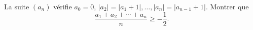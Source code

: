 La suite $(a_n)$ vérifie $a_0 = 0$, $|a_2| = |a_1 + 1|, \ldots, |a_n| = |a_{n-1} + 1|$. Montrer que
\[ \frac{a_1 + a_2 + \cdots + a_n}{n} \geq -\frac{1}{2}. \]
